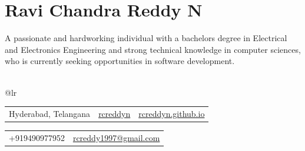 \documentclass{article}
\begin{document}
\section*{\Huge Ravi Chandra Reddy N}
A passionate and hardworking individual with a bachelors degree in Electrical and Electronics Engineering and strong technical knowledge in computer sciences, who is currently seeking opportunities in software development.\\ \\ 
\begin{tabular}{@{}lr}
\begin{tabular}{@{}lcr}
\faIcon{map-marker-alt} {Hyderabad, Telangana} & \faIcon{linkedin} \href{https://linkedin.com/in/rcreddyn}{rcreddyn} & \faIcon{globe} \href{https://rcreddyn.github.io}{rcreddyn.github.io}\\
\end{tabular}
\begin{tabular}{@{}lr}
\faIcon{phone} +919490977952 & \faIcon{envelope} \href{mailto:rcreddy1997@gmail.com}{rcreddy1997@gmail.com}\\
\end{tabular}
\end{tabular}
\end{document}

